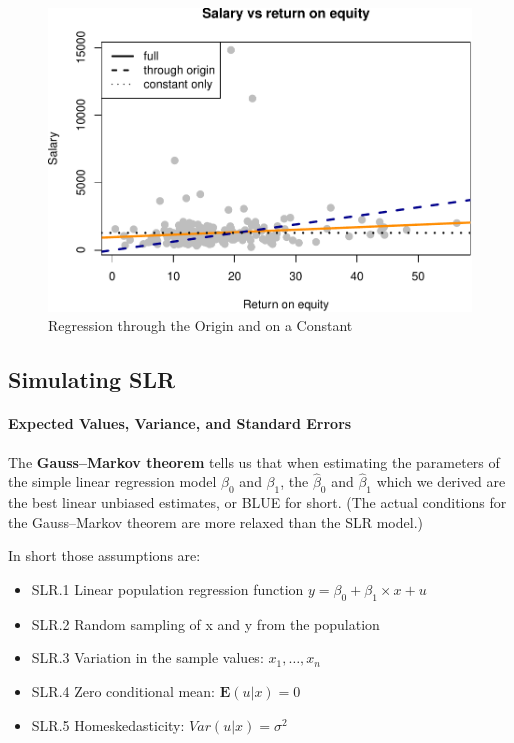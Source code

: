 \documentclass[]{book}
\providecommand{\tightlist}{%
  \setlength{\itemsep}{0pt}\setlength{\parskip}{0pt}}
\let\oldparagraph\paragraph
\renewcommand{\paragraph}[1]{\oldparagraph{#1}\mbox{}}
\begin{document}
\begin{figure}

{\centering \includegraphics[width=0.8\linewidth]{MEM5220_R_files/figure-latex/fig3-1} 

}

\caption{Regression through the Origin and on a Constant}\label{fig:fig3}
\end{figure}

\hypertarget{simulating-slr}{%
\subsection{Simulating SLR}\label{simulating-slr}}

\hypertarget{expected-values-variance-and-standard-errors}{%
\paragraph{Expected Values, Variance, and Standard
Errors}\label{expected-values-variance-and-standard-errors}}

The \textbf{Gauss--Markov theorem} tells us that when estimating the
parameters of the simple linear regression model \(\beta_{0}\) and
\(\beta_{1}\), the \(\hat{\beta}_{0}\) and \(\hat{\beta}_{1}\) which we
derived are the best linear unbiased estimates, or BLUE for short. (The
actual conditions for the Gauss--Markov theorem are more relaxed than
the SLR model.)

In short those assumptions are:

\begin{itemize}
\tightlist
\item
  SLR.1 Linear population regression function
  \(y = \beta_0 + \beta_{1} \times x + u\)
\item
  SLR.2 Random sampling of x and y from the population\\
\item
  SLR.3 Variation in the sample values: \(x_{1}, \dots , x_{n}\)
\item
  SLR.4 Zero conditional mean: \(\mathbf{E}(u|x) = 0\)
\item
  SLR.5 Homeskedasticity: \(Var(u|x) = \sigma^2\)
\end{itemize}
\end{document}
